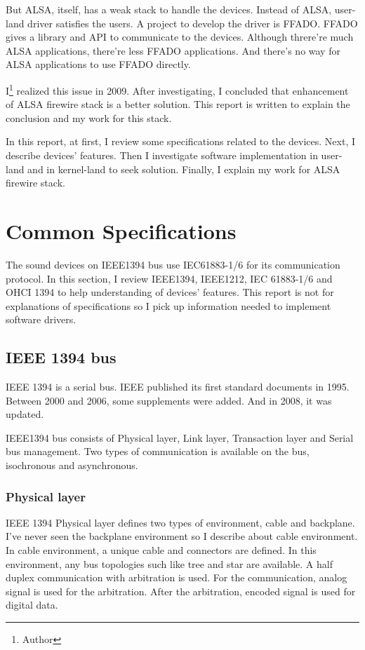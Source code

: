 \documentclass[onecolumn]{article}
\begin{document}
But ALSA, itself, has a weak stack to handle the devices. Instead of ALSA, user-land driver satisfies the users. A project to develop the driver is FFADO. FFADO gives a library and API to communicate to the devices. Although threre're much ALSA applications, there're less FFADO applications. And there's no way for ALSA applications to use FFADO directly.

I\footnote{Author} realized this issue in 2009. After investigating, I concluded that enhancement of ALSA firewire stack is a better solution. This report is written to explain the conclusion and my work for this stack.

In this report, at first, I review some specifications related to the devices. Next, I describe devices' features. Then I investigate software implementation in user-land and in kernel-land to seek solution. Finally, I explain my work for ALSA firewire stack.


\section{Common Specifications}

The sound devices on IEEE1394 bus use IEC61883-1/6 for its communication protocol. In this section, I review IEEE1394, IEEE1212, IEC 61883-1/6 and OHCI 1394 to help understanding of devices' features. This report is not for explanations of specifications so I pick up information needed to implement software drivers.

\subsection{IEEE 1394 bus}

IEEE 1394 is a serial bus. IEEE published its first standard documents in 1995\cite{ieee1394-1}. Between 2000 and 2006, some supplements were added\cite{ieee1394-1-a, ieee1394-1-b, ieee1394-1-c}. And in 2008, it was updated\cite{ieee1394-2}.

IEEE1394 bus consists of Physical layer, Link layer, Transaction layer and Serial bus management. Two types of communication is available on the bus, isochronous and asynchronous.

\subsubsection{Physical layer}
IEEE 1394 Physical layer defines two types of environment, cable and backplane. I've never seen the backplane environment so I describe about cable environment. In cable environment, a unique cable and connectors are defined. In this environment, any bus topologies such like tree and star are available. A half duplex communication with arbitration is used. For the communication, analog signal is used for the arbitration. After the arbitration, encoded signal is used for digital data.
\end{document}
